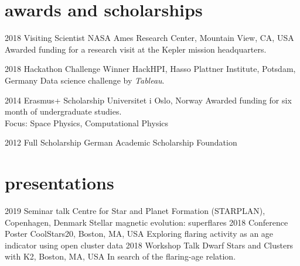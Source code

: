 \documentclass[]{k-cv} %
\begin{document}

\section{awards and scholarships}

\begin{entrylist}
\entry
{2018}
{Visiting Scientist}
{NASA Ames Research Center, Mountain View, CA, USA}
{Awarded funding for a research visit at the Kepler mission headquarters.}

\entry
{2018}
{Hackathon Challenge Winner}
{HackHPI, Hasso Plattner Institute, Potsdam, Germany}
{Data science challenge by \emph{Tableau}.}

\entry
{2014}
{Erasmus+ Scholarship}
{Universitet i Oslo, Norway}
{Awarded funding for six month of undergraduate studies.\\
Focus: Space Physics, Computational Physics}

\entry
{2012 }
{Full Scholarship}
{German Academic Scholarship Foundation}


\end{entrylist}

\clearpage



\section{presentations}

\begin{entrylist}
\entry
{2019}
{Seminar talk}
{Centre for Star and Planet Formation (STARPLAN), Copenhagen, Denmark}
{Stellar magnetic evolution: superflares}
\entry
{2018}
{Conference Poster}
{CoolStars20, Boston, MA, USA}
{Exploring flaring activity as an age indicator using open cluster data}
\entry
{2018}
{Workshop Talk}
{Dwarf Stars and Clusters with K2, Boston, MA, USA}
{In search of the flaring-age relation.}
\end{entrylist}

\end{document}

